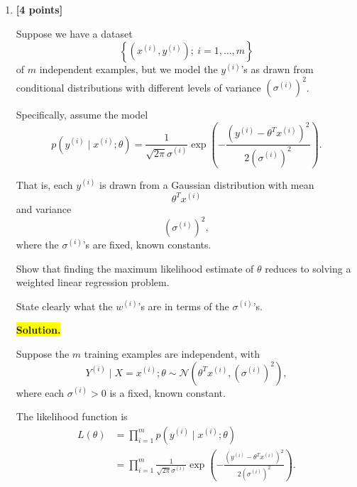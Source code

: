 \documentclass[10pt]{article}
\begin{document}
\begin{enumerate}
\begin{enumerate}[label=(\alph*)]
\begin{enumerate}[label=\roman*.]
Setting the gradient equal to zero yields
\[
2X^TW(X\theta-y)=0.
\]

Consequently,
\[
\boxed{
X^TWX\theta=X^TWy.
}
\]

This is the \textbf{weighted normal equation}.

Assuming $X^TWX$ is invertible, multiplying both
sides by $(X^TWX)^{-1}$ gives
\[
\boxed{
\theta^*=(X^TWX)^{-1}X^TWy.
}
\]

Furthermore, since $W$ is positive semidefinite,
\[
\nabla_\theta^2J(\theta)=2X^TWX\succeq 0.
\]
Thus, $J$ is convex, and the stationary point
$\theta^*$ is a global minimizer.


\item \textbf{[4 points]}

Suppose we have a dataset
\[
\left\{
(x^{(i)},y^{(i)});
\ i=1,\ldots,m
\right\}
\]
of $m$ independent examples, but we model the $y^{(i)}$'s as drawn
from conditional distributions with different levels of variance
$(\sigma^{(i)})^2$.

Specifically, assume the model
\[
p(y^{(i)}\mid x^{(i)};\theta)
=
\frac{1}{\sqrt{2\pi}\sigma^{(i)}}
\exp\left(
-
\frac{
\left(
y^{(i)}-\theta^Tx^{(i)}
\right)^2
}{
2(\sigma^{(i)})^2
}
\right).
\]

That is, each $y^{(i)}$ is drawn from a Gaussian distribution with mean
\[
\theta^Tx^{(i)}
\]
and variance
\[
(\sigma^{(i)})^2,
\]
where the $\sigma^{(i)}$'s are fixed, known constants.

Show that finding the maximum likelihood estimate of $\theta$ reduces
to solving a weighted linear regression problem.

State clearly what the $w^{(i)}$'s are in terms of the
$\sigma^{(i)}$'s.


\medskip
\noindent\colorbox{yellow}{\textbf{Solution.}}
\vspace{3mm}

Suppose the $m$ training examples are independent, with
\[
Y^{(i)}\mid X=x^{(i)};\theta
\sim
\mathcal{N}\left(\theta^Tx^{(i)},(\sigma^{(i)})^2\right),
\]
where each $\sigma^{(i)}>0$ is a fixed, known constant.

The likelihood function is
\[
\begin{aligned}
L(\theta)
&=\prod_{i=1}^{m}p(y^{(i)}\mid x^{(i)};\theta)\\
&=\prod_{i=1}^{m}
\frac{1}{\sqrt{2\pi}\sigma^{(i)}}
\exp\left(
-\frac{(y^{(i)}-\theta^Tx^{(i)})^2}
{2(\sigma^{(i)})^2}
\right).
\end{aligned}
\]


\end{enumerate}
\end{enumerate}
\end{enumerate}
\end{document}
